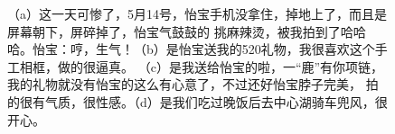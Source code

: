 \documentclass[cn,11pt,chinese]{elegantbook}
\begin{document}
\begin{figure}
    \caption{（a）这一天可惨了，5月14号，怡宝手机没拿住，掉地上了，而且是屏幕朝下，屏碎掉了，怡宝气鼓鼓的
    挑麻辣烫，被我拍到了哈哈哈。怡宝：哼，生气！（b）是怡宝送我的520礼物，我很喜欢这个手工相框，做的很逼真。
    （c）是我送给怡宝的啦，一“鹿”有你项链，我的礼物就没有怡宝的这么有心意了，不过还好怡宝脖子完美，
    拍的很有气质，很性感。（d）是我们吃过晚饭后去中心湖骑车兜风，很开心。}
\end{figure}
\end{document}
